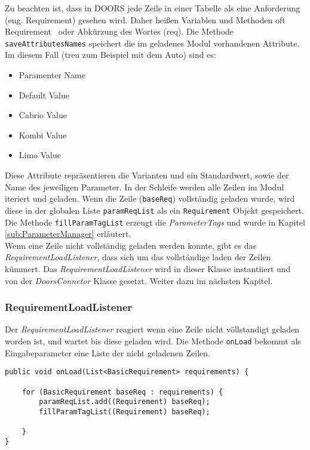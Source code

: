 Zu beachten ist, dass in DOORS jede Zeile in einer Tabelle als eine Anforderung (eng. Requirement) gesehen wird. Daher heißen Variablen und Methoden oft \glqq Requirement\grqq~ oder Abkürzung des Wortes (req). Die Methode \texttt{saveAttributesNames} speichert die im geladenes Modul vorhandenen Attribute. Im diesem Fall (treu zum Beispiel mit dem Auto) sind es:

\begin{itemize}\itemsep1pt
\item Paramenter Name
\item Default Value
\item Cabrio Value
\item Kombi Value
\item Limo Value
\end{itemize}

Diese Attribute repräsentieren die Varianten und ein Standardwert, sowie der Name des jeweiligen Parameter. In der Schleife werden alle Zeilen im Modul iteriert und geladen. Wenn die Zeile (\texttt{baseReq}) vollständig geladen wurde, wird diese in der globalen Liste \texttt{paramReqList} als ein \texttt{Requirement} Objekt gespeichert. Die Methode \texttt{fillParamTagList} erzeugt die \textit{ParameterTags} und wurde in Kapitel \ref{sub:ParameterManager} erläutert.\\

Wenn eine Zeile nicht vollständig geladen werden konnte, gibt es das \textit{RequirementLoadListener}, dass sich um das vollständige laden der Zeilen kümmert. Das \textit{RequirementLoadListener} wird in dieser Klasse instantiiert und von der \textit{DoorsConnetor} Klasse gesetzt. Weiter dazu im nächsten Kapitel.


\subsubsection{RequirementLoadListener}\label{sub.RequirementLoadListener}
Der \textit{RequirementLoadListener} reagiert wenn eine Zeile nicht völlstandigt geladen worden ist, und wartet bis diese geladen wird. Die Methode \texttt{onLoad} bekommt als Eingabeparameter eine Liste der nicht geladenen Zeilen.

\begin{lstlisting}[caption={Nachladen der Parametertabelle nach Zeilen}, captionpos=b]
public void onLoad(List<BasicRequirement> requirements) {

	for (BasicRequirement baseReq : requirements) {
		paramReqList.add((Requirement) baseReq);
		fillParamTagList((Requirement) baseReq);
		
	}
}
\end{lstlisting}

